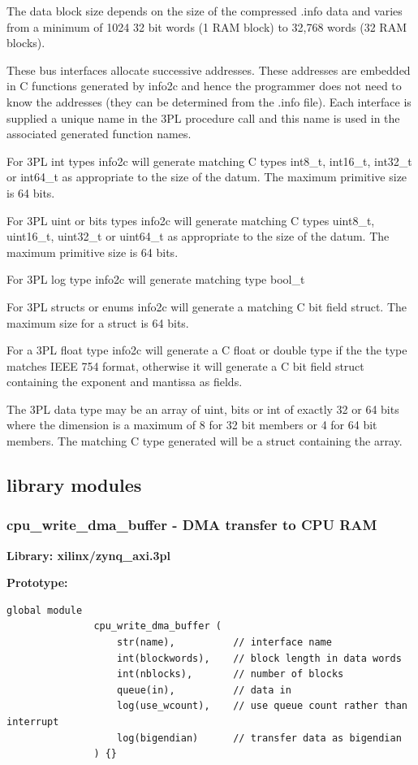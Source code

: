     The data block size depends on the size of the compressed .info data and
    varies from a minimum of 1024 32 bit words (1 RAM block) to 32,768 words (32
    RAM blocks).

    These bus interfaces allocate successive addresses. These addresses are
    embedded in C functions generated by info2c and hence the programmer does
    not need to know the addresses (they can be determined from the .info file).
    Each interface is supplied a unique name in the 3PL procedure call and this
    name is used in the associated generated function names.

    For 3PL int types info2c will generate matching C types int8\_t, int16\_t,
    int32\_t or int64\_t as appropriate to the size of the datum. The maximum
    primitive size is 64 bits.

    For 3PL uint or bits types info2c will generate matching C types uint8\_t,
    uint16\_t, uint32\_t or uint64\_t as appropriate to the size of the datum.
    The maximum primitive size is 64 bits.

    For 3PL log type info2c will generate matching type bool\_t

    For  3PL structs or enums info2c will generate a matching C bit field
    struct. The maximum size for a struct is 64 bits.

    For a 3PL float type info2c will generate a C float or double type if the
    the type matches IEEE 754 format, otherwise it will generate a C bit field
    struct containing the exponent and mantissa as fields.

    The 3PL data type may be an array of uint, bits or int of exactly 32 or 64
    bits where the dimension is a maximum of 8 for 32 bit members or 4 for 64
    bit members. The matching C type generated will be a struct containing the
    array.



    \subsection{library modules}


        \subsubsection{cpu\_write\_dma\_buffer - DMA transfer to CPU RAM}\label{sec:lmzynqdmabufr}

            {\bf Library: xilinx/zynq\_axi.3pl}

            {\bf Prototype:} \\
            \vsp
            \begin{lstlisting}[gobble=12, language=threepl]
               global module
               cpu_write_dma_buffer (
                   str(name),          // interface name
                   int(blockwords),    // block length in data words
                   int(nblocks),       // number of blocks
                   queue(in),          // data in
                   log(use_wcount),    // use queue count rather than interrupt
                   log(bigendian)      // transfer data as bigendian
               ) {}
            \end{lstlisting}


